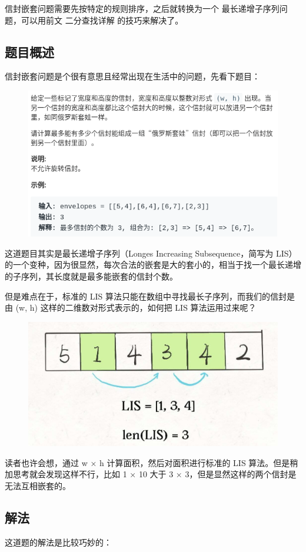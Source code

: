 \documentclass[12pt]{article}
\begin{document}
信封嵌套问题需要先按特定的规则排序，之后就转换为一个 最长递增子序列问题，可以用前文 二分查找详解 的技巧来解决了。

\subsection{题目概述}
信封嵌套问题是个很有意思且经常出现在生活中的问题，先看下题目：
\begin{figure}[H]
    \centering
    \includegraphics[width=1\textwidth]{fig/Envelope_Packing_1.png}
\end{figure}

这道题目其实是最长递增子序列（Longes Increasing Subsequence，简写为 LIS）的一个变种，因为很显然，每次合法的嵌套是大的套小的，相当于找一个最长递增的子序列，其长度就是最多能嵌套的信封个数。

但是难点在于，标准的 LIS 算法只能在数组中寻找最长子序列，而我们的信封是由 (w, h) 这样的二维数对形式表示的，如何把 LIS 算法运用过来呢？
\begin{figure}[H]
    \centering
    \includegraphics[width=.4\textwidth]{fig/Envelope_Packing_2.jpg}
\end{figure}

读者也许会想，通过 w × h 计算面积，然后对面积进行标准的 LIS 算法。但是稍加思考就会发现这样不行，比如 1 × 10 大于 3 × 3，但是显然这样的两个信封是无法互相嵌套的。

\subsection{解法}
这道题的解法是比较巧妙的：
\end{document}
